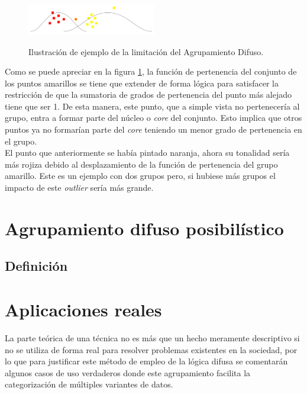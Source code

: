\documentclass[]{report}
\begin{document}
			\begin{figure}[h]
				\centering
				\includegraphics[width=0.5\textwidth]{problema-agrupamiento-difuso.jpg}
				\label{clustering_difuso_problema}
				\caption{Ilustración de ejemplo de la limitación del Agrupamiento Difuso.}
			\end{figure}
			
			Como se puede apreciar en la figura \ref{clustering_difuso_problema}, la función de pertenencia del conjunto de los puntos amarillos se tiene que extender de forma lógica para satisfacer la restricción de que la sumatoria de grados de pertenencia del punto más alejado tiene que ser 1. De esta manera, este punto, que a simple vista no pertenecería al grupo, entra a formar parte del núcleo o \textit{core} del conjunto. Esto implica que otros puntos ya no formarían parte del \textit{core} teniendo un menor grado de pertenencia en el grupo.\\
			
			El punto que anteriormente se había pintado naranja, ahora su tonalidad sería más rojiza debido al desplazamiento de la función de pertenencia del grupo amarillo. Este es un ejemplo con dos grupos pero, si hubiese más grupos el impacto de este \textit{outlier} sería más grande.
	
	\chapter{Agrupamiento difuso posibilístico}
	
		\section{Definición}
	
	\chapter{Aplicaciones reales}
	
		La parte teórica de una técnica no es más que un hecho meramente descriptivo si no se utiliza de forma real para resolver problemas existentes en la sociedad, por lo que para justificar este método de empleo de la lógica difusa se comentarán algunos casos de uso verdaderos donde este agrupamiento facilita la categorización de múltiples variantes de datos.\\
		
\end{document}
